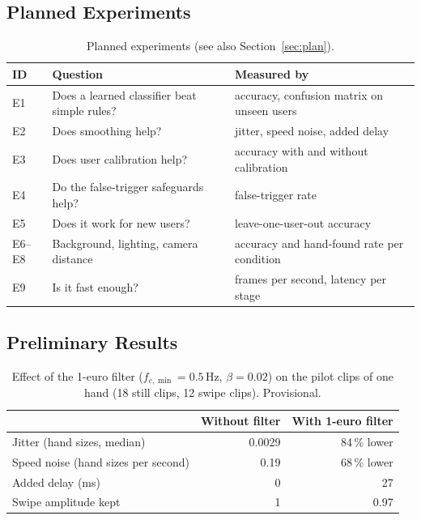 \subsection{Planned Experiments}
\begin{table}[h]
\centering
\begin{tabular}{@{}llp{7.5cm}@{}}
\toprule
ID & Question & Measured by \\
\midrule
E1 & Does a learned classifier beat simple rules? & accuracy, confusion matrix on unseen users \\
E2 & Does smoothing help? & jitter, speed noise, added delay \\
E3 & Does user calibration help? & accuracy with and without calibration \\
E4 & Do the false-trigger safeguards help? & false-trigger rate \\
E5 & Does it work for new users? & leave-one-user-out accuracy \\
E6--E8 & Background, lighting, camera distance & accuracy and hand-found rate per condition \\
E9 & Is it fast enough? & frames per second, latency per stage \\
\bottomrule
\end{tabular}
\caption{Planned experiments (see also Section~\ref{sec:plan}).}
\end{table}

\subsection{Preliminary Results}
\begin{table}[h]
\centering
\begin{tabular}{@{}lrr@{}}
\toprule
 & Without filter & With 1-euro filter \\
\midrule
Jitter (hand sizes, median) & 0.0029 & 84\,\% lower \\
Speed noise (hand sizes per second) & 0.19 & 68\,\% lower \\
Added delay (ms) & 0 & 27 \\
Swipe amplitude kept & 1 & 0.97 \\
\bottomrule
\end{tabular}
\caption{Effect of the 1-euro filter ($f_{c,\min} = 0.5$\,Hz, $\beta = 0.02$) on the pilot clips of one hand
(18 still clips, 12 swipe clips). Provisional. }
\end{table}
\fi

